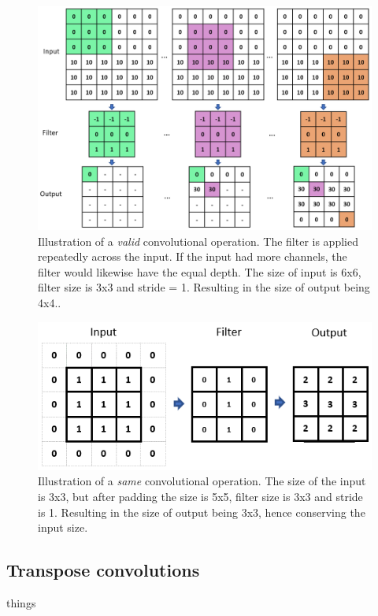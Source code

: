     
    \begin{figure}[H]
        \centering
        \includegraphics[scale=0.5]{figures/convolutions.png}
        \caption{Illustration of a \textit{valid} convolutional operation. The filter is applied repeatedly across the input. If the input had more channels, the filter would likewise have the equal depth. The size of input is 6x6, filter size is 3x3 and stride = 1. Resulting in the size of output being 4x4..}
      	\medskip 
        \label{convolutional_fig}
    \end{figure}
    
    \begin{figure}[H]
        \centering
        \includegraphics[scale=0.5]{figures/same_convolutions.png}
        \caption{Illustration of a \textit{same} convolutional operation. The size of the input is 3x3, but after padding the size is 5x5, filter size is 3x3 and stride is 1. Resulting in the size of output being 3x3, hence conserving the input size.}
      	\medskip 
        \label{same_convolutional_fig}
    \end{figure}
    

\subsection{Transpose convolutions}
    things
    
